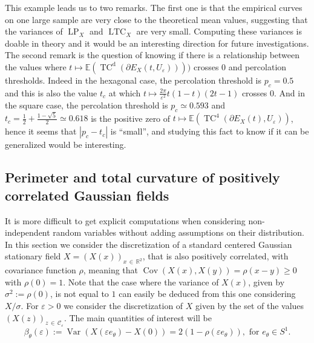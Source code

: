\documentclass[10pt]{amsart}
\theoremstyle{definition}\newtheorem{defi}[theo]{Definition}\newtheorem{rema}[theo]{Remark}\newtheorem{exam}[theo]{Example}\newtheorem{exem}[theo]{Example}\newtheorem{nota}[theo]{Notation}
\newcommand{\R}{\mathbb{R}}
\newcommand{\E}{\mathbb{E}}
\newcommand{\eps}{\varepsilon}
\DeclareMathOperator{\TC}{TC}
\DeclareMathOperator{\LTC}{LTC}
\DeclareMathOperator{\LP}{LP}
\newcommand{\dd}{\mathrm{d}}
\DeclareMathOperator{\Cov}{Cov}
\DeclareMathOperator{\Var}{Var}
\newcommand{\calC}{\mathcal{C}}
\begin{document}
This example leads us to two remarks. The first one is that the empirical curves on one large sample are very close to the theoretical mean values, suggesting that the variances of $\LP_X$ and $\LTC_X$ are very small. Computing these variances is doable in theory and it would be an interesting direction for future investigations. The second remark is the question of knowing if there is a relationship between the values where $t\mapsto\E(\TC^\dd(\partial E_X(t,U_\eps))))$ crosses $0$ and percolation thresholds. Indeed in the hexagonal case, the percolation threshold is $p_c=0.5$ and this is also the value $t_c$ at which $t\mapsto \tfrac{2\pi}{\eps^2} t(1-t)(2t-1) $ crosses $0$. And in the square case, the percolation threshold is $p_c\simeq 0.593$ and $t_c= \tfrac{1}{2} + \tfrac{1-\sqrt{5}}{2} \simeq 0.618$ is the positive zero of $t\mapsto \E(\TC^4(\partial E_X(t),U_\eps))$, hence it seems that $|p_c-t_c|$ is ``small'', and studying this fact to know if it can be generalized would be interesting.



\subsection{Perimeter and total curvature of positively correlated Gaussian fields}\label{GaussianDiscret:sec}

It is more difficult to get explicit computations when considering non-independent random variables without adding assumptions on their distribution. In this section we consider the discretization of a standard centered Gaussian stationary field $X=\left(X(x)\right)_{x\,\in\,\R^2}$, that is also positively correlated, with covariance function $\rho$, meaning that $\Cov(X(x),X(y))=\rho(x-y)\ge 0$ with $\rho(0)=1$. Note that the case where the variance of $X(x)$, given by $\sigma^2 := \rho(0)$, is not equal to $1$ can easily be deduced from this one considering $X/\sigma$. For $\eps>0$ we consider the discretization of $X$ given by the set of the values $\left(X(z)\right)_{z\,\in\,\calC_\eps}$. The main quantities of interest will be
\begin{equation}\label{beta}
\beta_\theta(\eps) := \Var\left(X(\eps e_\theta)-X(0)\right)=2\left(1-\rho(\eps e_\theta)\right), \text{ for } e_\theta \in S^1.
\end{equation}
\end{document}
